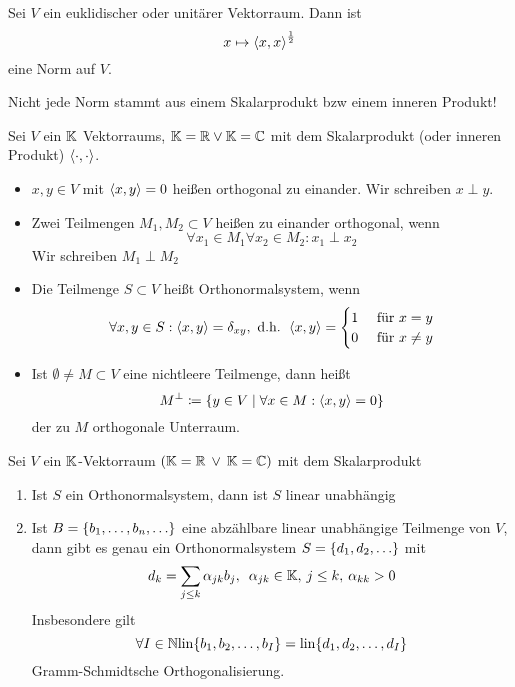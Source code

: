 \begin{definition}
    Sei $V$ ein euklidischer oder unitärer Vektorraum. Dann ist \[
        x \mapsto \scp{x,x}^\frac{1}{2}\]
    eine Norm auf $V$.
\end{definition}
\begin{remark}
    Nicht jede Norm stammt aus einem Skalarprodukt bzw einem inneren Produkt!
\end{remark}
\begin{definition}
    Sei $V$ ein $\K$ Vektorraums, $\K = \R \lor \K = \C$ mit dem Skalarprodukt
    (oder inneren Produkt) $\stdscp$. \begin{itemize}
        \item $x,y \in V$ mit $\scp{x,y} = 0$ heißen orthogonal zu einander. Wir
        schreiben $x\perp y$.
        \item Zwei Teilmengen $M_1,M_2 \subset V$ heißen zu einander orthogonal,
        wenn \[
            \forall x_1 \in M_1 \forall x_2 \in M_2: x_1 \perp x_2\]
        Wir schreiben $M_1 \perp M_2$
        \item Die Teilmenge $S\subset V$ heißt Orthonormalsystem, wenn \[
            \forall x,y\in S: \scp{x,y} = \delta_{xy}, \text{ d.h. } \scp{x,y} =
            \begin{cases}
            1 & \fuer x=y\\
            0 & \fuer x\neq y    
            \end{cases}\]
        \item Ist $\emptyset \neq M \subset V$ eine nichtleere Teilmenge, dann 
        heißt \[
            M^\perp \coloneqq \set{y \in V\mid \forall x \in M: \scp{x,y} = 0}\]
        der zu $M$ orthogonale Unterraum.
    \end{itemize}
\end{definition}
\begin{theorem}
    Sei $V$ ein $\K$-Vektorraum $\KeRoC$ mit dem Skalarprodukt \stdscp
    \begin{enumerate}
        \item Ist $S$ ein Orthonormalsystem, dann ist $S$ linear unabhängig 
        \item Ist $B = \set{b_1, \dots, b_n, \dots}$ eine abzählbare linear 
        unabhängige Teilmenge von $V$, dann gibt es genau ein Orthonormalsystem
        $S = \set{d_1, d_2, \dots}$ mit \[
            d_k = \sum_{j \leq k} \alpha_{jk}b_j, \midspace \alpha_{jk} \in \K,
            \smallspace j \leq k,\smallspace \alpha_{kk} > 0 \]
        Insbesondere gilt \[
        \forall I \in \N\lin{b_1, b_2, \dots, b_I} = \lin{d_1, d_2, \dots, d_I}\]
        Gramm-Schmidtsche Orthogonalisierung.
    \end{enumerate}
\end{theorem}

